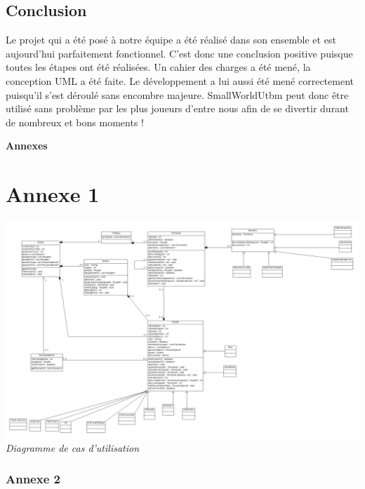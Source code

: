 \documentclass[a4paper, 11pt]{article}
\renewcommand{\appendixpage}{\huge \textbf{Annexes} \normalsize}
\begin{document}
		
	\section*{Conclusion}
	
	Le projet qui a été posé à notre équipe a été réalisé dans son ensemble et est aujourd'hui parfaitement fonctionnel. C'est donc une conclusion positive puisque toutes les étapes ont été réalisées. Un cahier des charges a été mené, la conception UML a été faite. Le développement a lui aussi été mené correctement puisqu'il s'est déroulé sans encombre majeure. SmallWorldUtbm peut donc être utilisé sans problème par les plus joueurs d'entre nous afin de se divertir durant de nombreux et bons moments !
		
		
	\newpage	
	
	\begin{appendix} 
	\appendixpage
	\addappheadtotoc
	
	\vspace*{1cm}
		\chapter{\textbf{Annexe 1}}
		
		\begin{center}
			\vspace*{3cm}
			\includegraphics[width=16cm]{DiagrammeDeCasDUtilisation.png}\\
			\emph{Diagramme de cas d'utilisation}		
		\end{center}
		
		\newpage
		
		
		\subsection*{Annexe 2}
		

\end{appendix}
\end{document}
